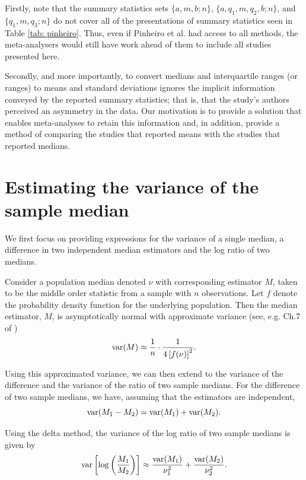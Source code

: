\documentclass{article}
\begin{document}
Firstly, note that the summary statistics sets $\{a, m, b; n\}$, $\{a, q_1, m, q_2, b; n\}$, and $\{q_1, m, q_3; n\}$ do not cover all of the presentations of summary statistics seen in Table \ref{tab: pinheiro}. Thus, even if Pinheiro et al. had access to all methods, the meta-analysers would still have work ahead of them to include all studies presented here.

Secondly, and more importantly, to convert medians and interquartile ranges (or ranges) to means and standard deviations ignores the implicit information conveyed by the reported summary statistics; that is, that the study's authors perceived an asymmetry in the data. Our motivation is to provide a solution that enables meta-analyses to retain this information and, in addition, provide a method of comparing the studies that reported means with the studies that reported medians.

\section{Estimating the variance of the sample median} \label{sec: est}

We first focus on providing expressions for the variance of a single median, a difference in two independent median estimators and the log ratio of two medians.

Consider a population median denoted $\nu$ with corresponding estimator $M$, taken to be the middle order statistic from a sample with $n$ observations.  Let $f$ denote the probability density function for the underlying population.  Then the median estimator, $M$, is asymptotically normal with approximate variance (see, e.g. Ch.7 of \cite{dasgupta2008asymptotic})
\begin{equation}\label{eqn: var est}
\operatorname{var}(M)\approx \frac{1}{n}\cdot\frac{1}{4\left[f(\nu)\right]^2}.
\end{equation}


Using this approximated variance, we can then extend to the variance of the difference and the variance of the ratio of two sample medians. For the difference of two sample medians, we have, assuming that the estimators are independent,
\begin{equation}\label{eqn: var diff}
\operatorname{var}(M_1-M_2) = \operatorname{var}(M_1) + \operatorname{var}(M_2).
\end{equation}

Using the delta method, the variance of the log ratio of two sample medians is given by
\begin{equation}\label{eqn: var lr}
\operatorname{var}\left[\log\left(\frac {M_1}{M_2 }\right)\right] \approx  \frac{\operatorname{var}(M_1)}{\nu_1^2}+ \frac{\operatorname{var}(M_2)} {\nu_2^2}.
\end{equation}
\end{document}
